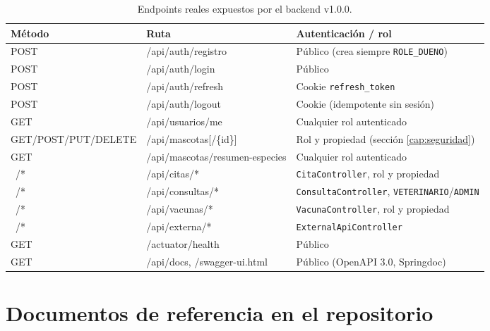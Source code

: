 \begin{table}[H]
  \centering
  \small
  \caption{Endpoints reales expuestos por el backend v1.0.0.}
  \label{tab:endpoints-final}
  \begin{tabular}{@{}llp{7.0cm}@{}}
    \toprule
    M\'etodo & Ruta & Autenticaci\'on / rol \\
    \midrule
    POST & /api/auth/registro & P\'ublico (crea siempre \texttt{ROLE\_DUENO}) \\
    POST & /api/auth/login & P\'ublico \\
    POST & /api/auth/refresh & Cookie \texttt{refresh\_token} \\
    POST & /api/auth/logout & Cookie (idempotente sin sesi\'on) \\
    GET & /api/usuarios/me & Cualquier rol autenticado \\
    GET/POST/PUT/DELETE & /api/mascotas[/\{id\}] & Rol y propiedad (secci\'on \ref{cap:seguridad}) \\
    GET & /api/mascotas/resumen-especies & Cualquier rol autenticado \\
    \ /* & /api/citas/* & \texttt{CitaController}, rol y propiedad \\
    \ /* & /api/consultas/* & \texttt{ConsultaController}, \texttt{VETERINARIO}/\texttt{ADMIN} \\
    \ /* & /api/vacunas/* & \texttt{VacunaController}, rol y propiedad \\
    \ /* & /api/externa/* & \texttt{ExternalApiController} \\
    GET & /actuator/health & P\'ublico \\
    GET & /api/docs, /swagger-ui.html & P\'ublico (OpenAPI 3.0, Springdoc) \\
    \bottomrule
  \end{tabular}
\end{table}

\section{Documentos de referencia en el repositorio}

